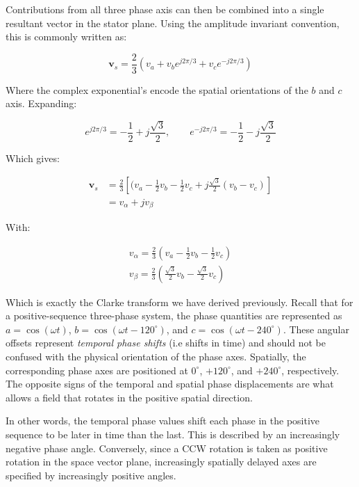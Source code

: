 \documentclass{article}
\begin{document}
Contributions from all three phase axis can then be combined into a single resultant vector in the stator plane. Using the amplitude invariant convention, this is commonly written as:

\begin{equation}
    \mathbf{v}_s = \frac{2}{3}(v_a + v_be^{j2\pi/3} + v_ce^{-j2\pi/3})
\end{equation}

Where the complex exponential's encode the spatial orientations of the $b$ and $c$ axis. Expanding:

\begin{equation}
    e^{j2\pi/3} = -\frac{1}{2} + j\frac{\sqrt{3}}{2}, \qquad
    e^{-j2\pi/3} = -\frac{1}{2} - j\frac{\sqrt{3}}{2}
\end{equation}

Which gives:

\begin{align}
    \mathbf{v}_s &= \frac{2}{3}\left[(v_a - \frac{1}{2}v_b - \frac{1}{2}v_c + j\frac{\sqrt{3}}{2}(v_b - v_c) \right] \\
    &= v_\alpha + jv_\beta
\end{align}

With:

\begin{align}
    v_\alpha = \frac{2}{3}\left(v_a -\frac{1}{2}v_b - \frac{1}{2}v_c \right) \\[6pt]
    v_\beta = \frac{2}{3}\left(\frac{\sqrt{3}}{2}v_b - \frac{\sqrt{3}}{2}v_c \right)
\end{align}

Which is exactly the Clarke transform we have derived previously. Recall that for a positive-sequence three-phase system, the phase quantities are represented as \(a=\cos(\omega t)\), \(b=\cos(\omega t-120^\circ)\), and \(c=\cos(\omega t-240^\circ)\). These angular offsets represent \textit{temporal phase shifts} (i.e shifts in time) and should not be confused with the physical orientation of the phase axes. Spatially, the corresponding phase axes are positioned at \(0^\circ\), \(+120^\circ\), and \(+240^\circ\), respectively. The opposite signs of the temporal and spatial phase displacements are what allows a field that rotates in the positive spatial direction.

In other words, the temporal phase values shift each phase in the positive sequence to be later in time than the last. This is described by an increasingly negative phase angle. Conversely, since a CCW rotation is taken as positive rotation in the space vector plane, increasingly spatially delayed axes are specified by increasingly positive angles. 
\end{document}
